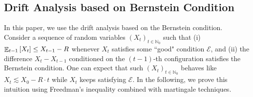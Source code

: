 \documentclass[letterpaper,11pt]{article}
\newtheorem{lemma}[theorem]{Lemma}
\DeclareMathOperator*{\E}{\mathbb{E}}
\newcommand{\Nat}{\mathbb{N}}
\newcommand{\calE}{\mathcal{E}}
\newcommand{\drift}{R}
\begin{document}
  

  
 \subsection{Drift Analysis based on Bernstein Condition} \label{sec:drift analysis intro}
  In this paper, we use the drift analysis based on the Bernstein condition.
   Consider a sequence of random variables $(X_t)_{t\in \Nat_0}$ such that (i) $\E_{t-1}\qty[ X_t ] \le X_{t-1} - \drift$ whenever $X_t$ satisfies some “good" condition $\calE$, and (ii) the difference $X_t - X_{t-1}$ conditioned on the $(t-1)$-th configuration satisfies the Bernstein condition.
    One can expect that such $(X_t)_{t\in \Nat_0}$ behaves like $X_t \lesssim X_0 - \drift\cdot t$ while $X_t$ keeps satisfying $\calE$.
    In the following, we prove this intuition using Freedman's inequality combined with martingale techniques.
\end{document}

